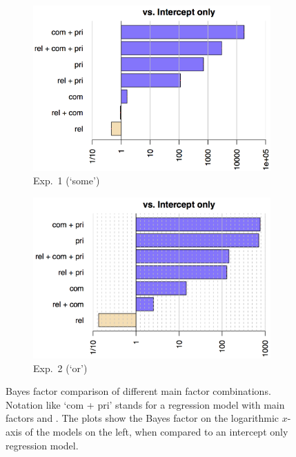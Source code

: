 \documentclass[12pt]{article}
\begin{document}
\begin{figure}
    \centering
    \begin{subfigure}[b]{0.49\textwidth}
      \includegraphics[width = \linewidth]{pics_02/bfsAllExp1_cropped.png}
  \caption{Exp.~1 (`some')}
  \label{fig:BFsExp1}
    \end{subfigure}
    \hfill
    \begin{subfigure}[b]{0.49\textwidth}
      \centering
      \includegraphics[width = \textwidth]{pics_02/bfsAllExp2_cropped.png}
      \caption{Exp.~2 (`or')}
      \label{fig:BFsExp2}
    \end{subfigure}
    \caption{Bayes factor comparison of different main factor combinations. Notation like `com
      + pri' stands for a regression model with main factors \com and \pri. The plots show the
      Bayes factor on the logarithmic $x$-axis of the models on the left, when compared to an
      intercept only regression model.}\label{fig:BFs}
\end{figure}
\end{document}
